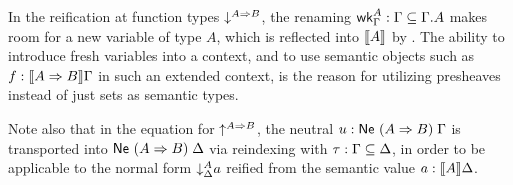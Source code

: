 \documentclass[sigconf,screen,fleqn]{acmart} %
\begin{document}
In the reification at function types
$\down{A \To B}$,
the renaming $\twk^A_\Gamma : \Gamma \sublist \cext \Gamma A$
makes room
for a new variable of type $A$, which is reflected into $\den A$ by
.
The ability to introduce fresh variables into a context, and to use
semantic objects such as $f : \den{A \To B}\Gamma$ in such an extended
context, is the reason for utilizing presheaves instead of just sets
as semantic types.

Note also that in the equation for $\up{A \To B}$,
the neutral $u : \Ne {(A \To B)} \Gamma$ is
transported into $\Ne {(A \To B)} \Delta$ via reindexing with
$\tau : \Gamma \sublist \Delta$, in order to be applicable to the normal form
$\down[\Delta]A a$
reified from the semantic value $a : \den A \Delta$.
\end{document}
